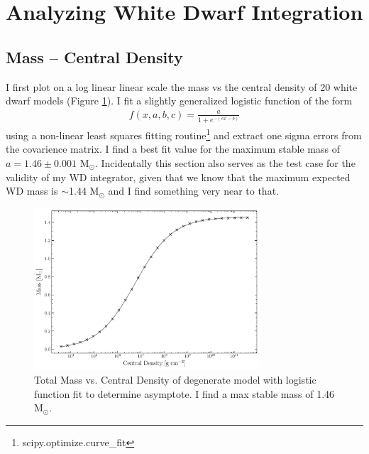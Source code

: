 \section{Analyzing White Dwarf Integration}
\subsection{Mass -- Central Density}
I first plot on a log linear linear scale the mass vs the central density of 20 white dwarf models (Figure \ref{fig:WDmass}). I fit a slightly generalized logistic function of the form
\begin{align*}
    f(x, a, b, c) = \frac{a}{1+e^{-(cx-b)}}
\end{align*}
using a non-linear least squares fitting routine\footnote{scipy.optimize.curve\_fit} and extract one sigma errors from the covarience matrix. I find a best fit value for the maximum stable mass of $a=1.46\pm0.001$ M$_{\odot}$. Incidentally this section also serves as the test case for the validity of my WD integrator, given that we know that the maximum expected WD mass is $\sim$1.44 M$_{\odot}$ and I find something very near to that.
\begin{figure}[ht!]
    \centering
    \includegraphics[width=0.75\textwidth]{Graphics/WDMasses.pdf}
    \caption{Total Mass vs. Central Density of degenerate model with logistic function fit to determine asymptote. I find a max stable mass of 1.46 M$_{\odot}$.}
    \label{fig:WDmass}
\end{figure}
